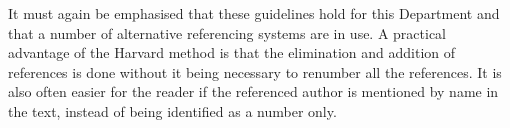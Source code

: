 \documentclass[a5paper, 10pt]{article}
\begin{document}
It must again be emphasised that these guidelines hold for this
Department and that a number of alternative referencing systems are in
use.  A practical advantage of the Harvard method is that the
elimination and addition of references is done without it being
necessary to renumber all the references.  It is also often easier for
the reader if the referenced author is mentioned by name in the text,
instead of being identified as a number only.
\end{document}
